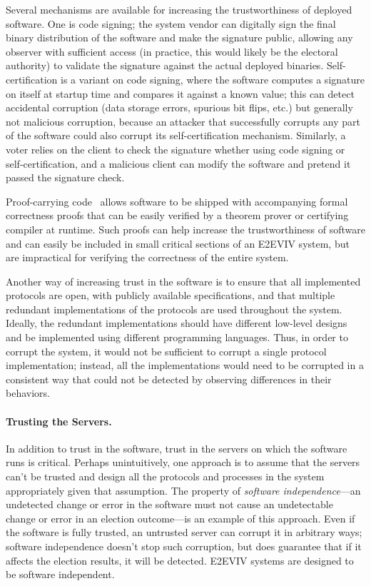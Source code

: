Several mechanisms are available for increasing the trustworthiness of
deployed software. One is code signing; the system vendor can
digitally sign the final binary distribution of the software and make
the signature public, allowing any observer with sufficient access (in
practice, this would likely be the electoral authority) to validate
the signature against the actual deployed binaries. Self-certification
is a variant on code signing, where the software computes a signature
on itself at startup time and compares it against a known value;
this can detect accidental corruption (data storage errors, spurious
bit flips, etc.) but generally not malicious corruption, because an
attacker that successfully corrupts any part of the software could
also corrupt its self-certification mechanism. Similarly, a voter relies on the client to check the signature whether using code signing or self-certification, and a malicious client can modify the software and pretend it passed the signature check.  

Proof-carrying code~\cite{Necula02} allows software to be shipped with
accompanying formal correctness proofs that can be easily verified by
a theorem prover or certifying compiler at runtime. Such proofs can
help increase the trustworthiness of software and can easily be
included in small critical sections of an E2EVIV system, but are
impractical for verifying the correctness of the entire system.

Another way of increasing trust in the software is to ensure that all
implemented protocols are open, with publicly available
specifications, and that multiple redundant implementations of the
protocols are used throughout the system. Ideally, the redundant
implementations should have different low-level designs and be
implemented using different programming languages. Thus, in order to
corrupt the system, it would not be sufficient to corrupt a single
protocol implementation; instead, all the implementations would need
to be corrupted in a consistent way that could not be detected by
observing differences in their behaviors.

\paragraph{Trusting the Servers.} In addition to trust in the
software, trust in the servers on which the software runs is
critical. Perhaps unintuitively, one approach is to assume that the
servers can't be trusted and design all the protocols and processes in
the system appropriately given that assumption. The property of
\emph{software independence}---an undetected change or error in the
software must not cause an undetectable change or error in an election
outcome---is an example of this approach. Even if the software is
fully trusted, an untrusted server can corrupt it in arbitrary ways;
software independence doesn't stop such corruption, but does guarantee
that if it affects the election results, it will be detected. 
E2EVIV systems are designed to be software independent. 

